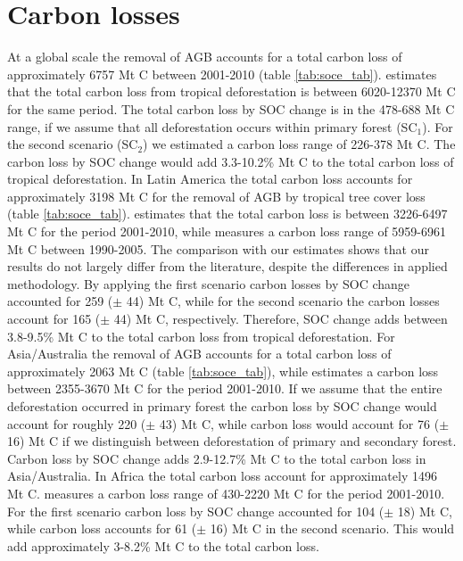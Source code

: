 	\section{Carbon losses}
		At a global scale the removal of \ac{AGB} accounts for a total carbon loss of approximately 6757 Mt C between 2001-2010 (table \ref{tab:soce_tab}). \citet{Achard2014} estimates that the total carbon loss from tropical deforestation is between 6020-12370 Mt C for the same period. The total carbon loss by \ac{SOC} change is in the 478-688 Mt C range, if we assume that all deforestation occurs within primary forest (SC$_1$). For the second scenario (SC$_2$) we estimated a carbon loss range of 226-378 Mt C. The carbon loss by \ac{SOC} change would add 3.3-10.2\% Mt C to the total carbon loss of tropical deforestation. In Latin America the total carbon loss accounts for approximately 3198 Mt C for the removal of \ac{AGB} by tropical tree cover loss (table \ref{tab:soce_tab}). \citeauthor{Achard2014} estimates that the total carbon loss is between 3226-6497 Mt C for the period 2001-2010, while \citet{Sy2015} measures a carbon loss range of 5959-6961 Mt C between 1990-2005. The comparison with our estimates shows that our results do not largely differ from the literature, despite the differences in applied methodology. By applying the first scenario carbon losses by \ac{SOC} change accounted for 259 ($\pm$ 44) Mt C, while for the second scenario the carbon losses account for 165 ($\pm$ 44) Mt C, respectively. Therefore, \ac{SOC} change adds between 3.8-9.5\% Mt C to the total carbon loss from tropical deforestation. For Asia/Australia the removal of \ac{AGB} accounts for a total carbon loss of approximately 2063 Mt C (table \ref{tab:soce_tab}), while \citeauthor{Achard2014} estimates a carbon loss between 2355-3670 Mt C for the period 2001-2010. If we assume that the entire deforestation occurred in primary forest the carbon loss by \ac{SOC} change would account for roughly 220 ($\pm$ 43) Mt C, while carbon loss would account for 76 ($\pm$ 16) Mt C if we distinguish between deforestation of primary and secondary forest. Carbon loss by \ac{SOC} change adds 2.9-12.7\% Mt C to the total carbon loss in Asia/Australia. In Africa the total carbon loss account for approximately 1496 Mt C. \citeauthor{Achard2014} measures a carbon loss range of 430-2220 Mt C for the period 2001-2010. For the first scenario carbon loss by \ac{SOC} change accounted for 104 ($\pm$ 18) Mt C, while carbon loss accounts for 61 ($\pm$ 16) Mt C in the second scenario. This would add approximately 3-8.2\% Mt C to the total carbon loss.
